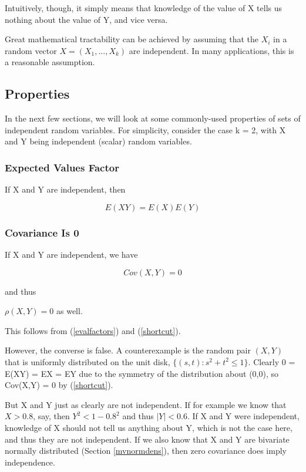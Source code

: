 Intuitively, though, it simply means that knowledge of the value of X
tells us nothing about the value of Y, and vice versa.

Great mathematical tractability can be achieved by assuming that the
$X_i$ in a random vector $X = (X_1,...,X_k)$ are independent.  In many
applications, this is a reasonable assumption.

\subsection{Properties}

In the next few sections, we will look at some commonly-used properties
of sets of independent random variables.  For simplicity, consider the
case k = 2, with X and Y being independent (scalar) random variables.

\subsubsection{Expected Values Factor}

If X and Y are independent, then 

\begin{equation}
\label{evalfactors}
E(XY) = E(X) E(Y)
\end{equation}

\subsubsection{Covariance Is 0}

If X and Y are independent, we have

\begin{equation}
\label{cov0}
Cov(X,Y) = 0
\end{equation}

and thus

$\rho(X,Y) = 0$ as well.

This follows from (\ref{evalfactors}) and (\ref{shortcut}).

However, the converse is false.  A counterexample is the random pair
$(X,Y)$ that is uniformly distributed on the unit disk, $\{(s,t):
s^2+t^2 \leq 1\}$.  Clearly 0 = E(XY) = EX = EY due to the symmetry of
the distribution about (0,0), so Cov(X,Y) = 0 by (\ref{shortcut}).  

But X and Y just as clearly are not independent.  If for example we know that
$X > 0.8$, say, then $Y^2 < 1 - 0.8^2$ and thus $|Y| < 0.6$.  If X and Y
were independent, knowledge of X should not tell us anything about Y,
which is not the case here, and thus they are not independent.  If we
also know that X and Y are bivariate normally distributed (Section
\ref{mvnormdens}), then zero covariance does imply independence.

